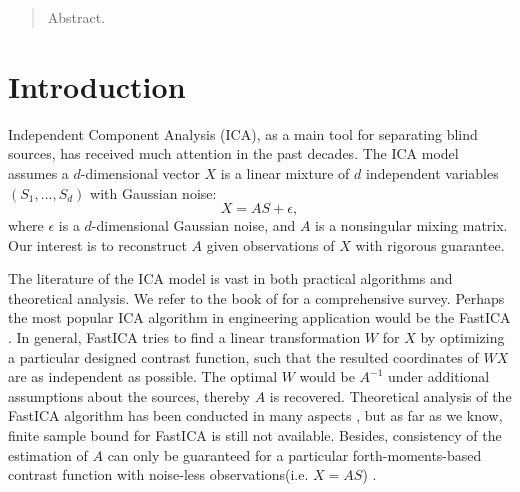 \documentclass[twoside]{article}
\theoremstyle{definition}
\begin{document}
%

%


\begin{abstract}
Abstract.
\end{abstract}

\section{Introduction}
\label{sec:Intro}
Independent Component Analysis (ICA), as a main tool for separating blind sources, has received much attention in the past decades. 
The ICA model assumes a $d$-dimensional vector $X$ is a linear mixture of $d$ independent variables $(S_1,\ldots, S_d)$ with Gaussian noise:
\[
X = AS+\epsilon,
\]
where $\epsilon$ is a $d$-dimensional Gaussian noise, and $A$ is a nonsingular mixing matrix.
Our interest is to reconstruct $A$ given observations of $X$ with rigorous guarantee.

The literature of the ICA model is vast in both practical algorithms and theoretical analysis. 
We refer to the book of \citet{comon2010handbook} for a comprehensive survey.
Perhaps the most popular ICA algorithm in engineering application would be the FastICA \citep{hyvarinen1999fast}. 
In general, FastICA tries to find a linear transformation $W$ for $X$ by optimizing a particular designed contrast function, 
such that the resulted coordinates of $WX$ are as independent as possible. 
The optimal $W$ would be $A^{-1}$ under additional assumptions about the sources, thereby $A$ is recovered.  
Theoretical analysis of the FastICA algorithm has been conducted in many aspects \citep{tichavsky2006performance,oja2006fastica,ollila2010deflation,dermoune2013fastica,wei2014convergence}, 
but as far as we know, finite sample bound for FastICA is still not available.
Besides, consistency of the estimation of $A$ can only be guaranteed for a particular forth-moments-based contrast function with noise-less observations(i.e. $X = AS$) \citep{miettinen2014fourth}. 
\end{document}
